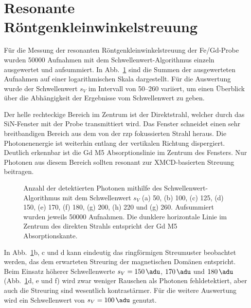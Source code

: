 \section{Resonante Röntgenkleinwinkelstreuung}
Für die Messung der resonanten Röntgenkleinwinkelstreuung der Fe/Gd-Probe wurden \num{50000} Aufnahmen mit dem Schwellenwert-Algorithmus einzeln ausgewertet und aufsummiert. In Abb.~\ref{fig:th_50_100_125_150_170_180_200_220_260} sind die Summen der ausgewerteten Aufnahmen auf einer logarithmischen Skala dargestellt. Für die Auswertung wurde der Schwellenwert $s_V$ im Intervall von \SIrange{50}{260}{\adu} variiert, um einen Überblick über die Abhängigkeit der Ergebnisse vom Schwellenwert zu geben. 

\noindent
Der helle rechteckige Bereich im Zentrum ist der Direktstrahl, welcher durch das SiN-Fenster mit der Probe transmittiert wird. Das Fenster schneidet einen sehr breitbandigen Bereich aus dem von der \gls{rzp} fokussierten Strahl heraus. Die Photonenenergie ist weiterhin entlang der vertikalen Richtung dispergiert. Deutlich erkennbar ist die Gd M5 Absorptionslinie im Zentrum des Fensters. Nur Photonen aus diesem Bereich sollten resonant zur XMCD-basierten Streuung beitragen.

\begin{figure}[H]
    \centering
    
    \caption{Anzahl der detektierten Photonen mithilfe des Schwellenwert-Algorithmus mit dem Schwellenwert $s_V$ (a) \SI{50}{\adu}, (b) \SI{100}{\adu}, (c) \SI{125}{\adu}, (d) \SI{150}{\adu}, (e) \SI{170}{\adu}, (f) \SI{180}{\adu}, (g) \SI{200}{\adu}, (h) \SI{220}{\adu} und (g) \SI{260}{\adu}. Aufsummiert wurden jeweils \num{50000} Aufnahmen. Die dunklere horizontale Linie im Zentrum des direkten Strahls entspricht der Gd M5 Absorptionskante.}
    \label{fig:th_50_100_125_150_170_180_200_220_260}
\end{figure}
\noindent
In Abb.~\ref{fig:th_50_100_125_150_170_180_200_220_260}b, c und d kann eindeutig das ringförmigen Streumuster beobachtet werden, das dem erwarteten Streuring der magnetischen Domänen entspricht. Beim Einsatz höherer Schwellenwerte $s_V = \SI{150}{\adu}$, $\SI{170}{\adu}$ und $\SI{180}{\adu}$ (Abb.~\ref{fig:th_50_100_125_150_170_180_200_220_260}d, e und f) wird zwar weniger Rauschen als Photonen fehldetektiert, aber auch die Streuring sind wesentlich kontrastärmer. Für die weitere Auswertung wird ein Schwellenwert von $s_V = \SI{100}{\adu}$ genutzt.

